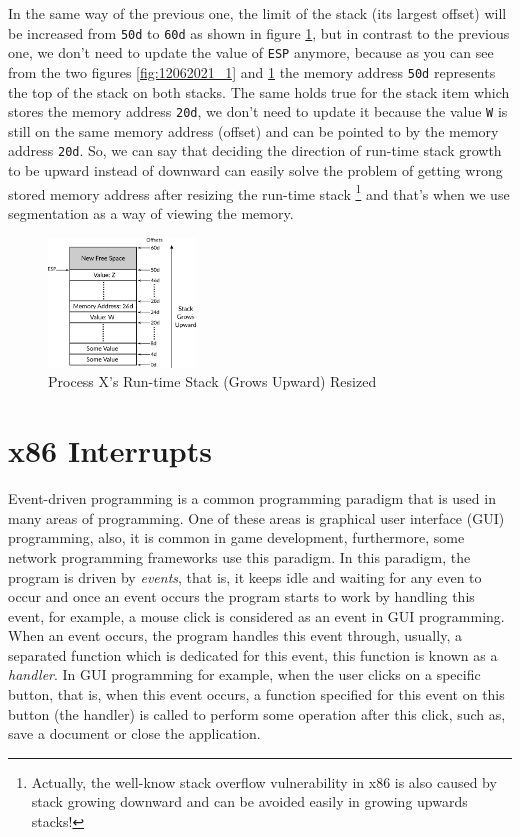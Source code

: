 In the same way of the previous one, the limit of the stack (its largest
offset) will be increased from \lstinline!50d! to \lstinline!60d! as
shown in figure \ref{fig:12062021_2}, but in contrast to the previous
one, we don't need to update the value of \lstinline!ESP! anymore,
because as you can see from the two figures \ref{fig:12062021_1} and
\ref{fig:12062021_2} the memory address \lstinline!50d! represents the
top of the stack on both stacks. The same holds true for the stack item
which stores the memory address \lstinline!20d!, we don't need to update
it because the value \lstinline!W! is still on the same memory address
(offset) and can be pointed to by the memory address \lstinline!20d!.
So, we can say that deciding the direction of run-time stack growth to
be upward instead of downward can easily solve the problem of getting
wrong stored memory address after resizing the run-time stack \footnote{Actually,
  the well-know stack overflow vulnerability in x86 is also caused by
  stack growing downward and can be avoided easily in growing upwards
  stacks!} and that's when we use segmentation as a way of viewing the
memory.

\begin{figure}
\centering
\includegraphics[width=0.35000\textwidth]{Figures/x86-ch/Fig12062021_2.png}
\caption{Process X's Run-time Stack (Grows Upward)
Resized}\label{fig:12062021_2}
\end{figure}

\section{x86 Interrupts}\label{x86-interrupts}

Event-driven programming is a common programming paradigm that is used
in many areas of programming. One of these areas is graphical user
interface (GUI) programming, also, it is common in game development,
furthermore, some network programming frameworks use this paradigm. In
this paradigm, the program is driven by \emph{events}, that is, it keeps
idle and waiting for any even to occur and once an event occurs the
program starts to work by handling this event, for example, a mouse
click is considered as an event in GUI programming. When an event
occurs, the program handles this event through, usually, a separated
function which is dedicated for this event, this function is known as a
\emph{handler}. In GUI programming for example, when the user clicks on
a specific button, that is, when this event occurs, a function specified
for this event on this button (the handler) is called to perform some
operation after this click, such as, save a document or close the
application.

